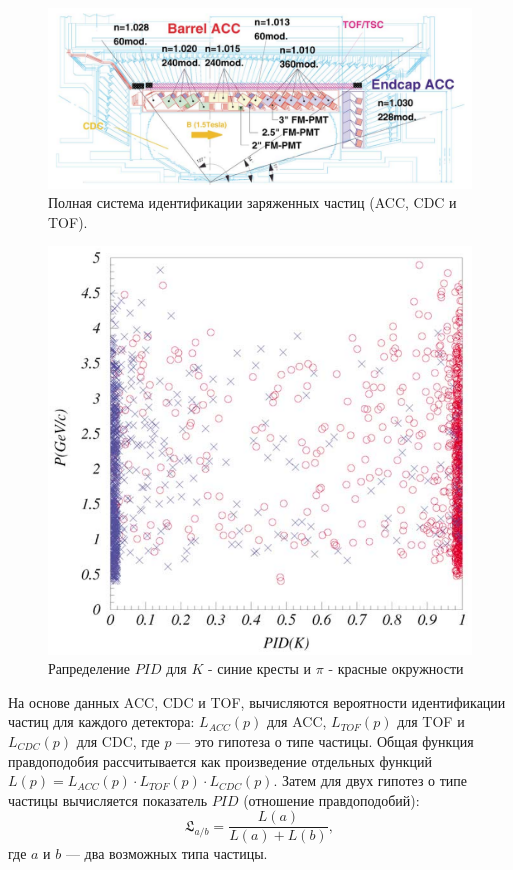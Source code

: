\begin{figure}[!htb]
    \centering
    \includegraphics[width=1\linewidth]{img/Ch_hadr_id.png}
    \caption{Полная система идентификации заряженных частиц (ACC, CDC и TOF).}
    \label{the:ch_hadr_id}
\end{figure}

\begin{figure}
    \centering
    \includegraphics[width=0.7\linewidth]{img/L_P.png}
    \caption{Рапределение $PID$ для $K$ - синие кресты и $\pi$ - красные окружности}
    \label{the:li}
\end{figure}

На основе данных ACC, CDC и TOF, вычисляются вероятности идентификации частиц для каждого детектора: $L_{ACC}(p)$ для ACC, 
$L_{TOF}(p)$ для TOF и $L_{CDC}(p)$ для CDC, где $p$ — это гипотеза о типе частицы. 
Общая функция правдоподобия рассчитывается как произведение отдельных функций 
$L(p) = L_{ACC}(p) \cdot L_{TOF}(p) \cdot L_{CDC}(p)$.
Затем для двух гипотез о типе частицы вычисляется показатель $PID$ (отношение правдоподобий):
\begin{equation}
    \mathfrak{L}_{a/b} = \frac{L(a)}{L(a) + L(b)},
\end{equation}
где $a$ и $b$ — два возможных типа частицы.




